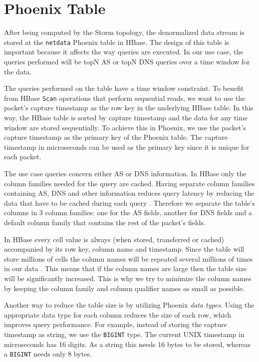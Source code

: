 \section{Phoenix Table}\label{section:system_phoenix_table}

After being computed by the Storm topology, the denormalized data stream is stored at the \texttt{netdata} Phoenix table in HBase. The design of this table is important because it affects the way queries are executed. In our use case, the queries performed will be topN AS or topN DNS queries over a time window for the data. 

The queries performed on the table have a time window constraint. To benefit from HBase \texttt{Scan} operations that perform sequential reads, we want to use the packet's capture timestamp as the row key in the underlying HBase table. In this way, the HBase table is sorted by capture timestamp and the data for any time window are stored sequentially. To achieve this in Phoenix, we use the packet's capture timestamp as the primary key of the Phoenix table. The capture timestamp in microseconds can be used as the primary key since it is unique for each packet.

The use case queries concern either AS or DNS information. In HBase only the column families needed for the query are cached. Having separate column families containing AS, DNS and other information reduces query latency by reducing the data that have to be cached during each query \cite{hbase_reference}. Therefore we separate the table's columns in 3 column families: one for the AS fields, another for DNS fields and a default column family that contains the rest of the packet's fields.

In HBase every cell value is always (when stored, transferred or cached) accompanied by its row key, column name and timestamp. Since the table will store millions of cells the column names will be repeated several millions of times in our data \cite{hbase_reference}. This means that if the column names are large then the table size will be significantly increased. This is why we try to minimize the column names by keeping the column family and column qualifier names as small as possible.

Another way to reduce the table size is by utilizing Phoenix \emph{data types}. Using the appropriate data type for each column reduces the size of each row, which improves query performance. For example, instead of storing the capture timestamp as string, we use the \texttt{BIGINT} type. The current UNIX timestamp in microseconds has 16 digits. As a string this needs 16 bytes to be stored, whereas a \texttt{BIGINT} needs only 8 bytes.

